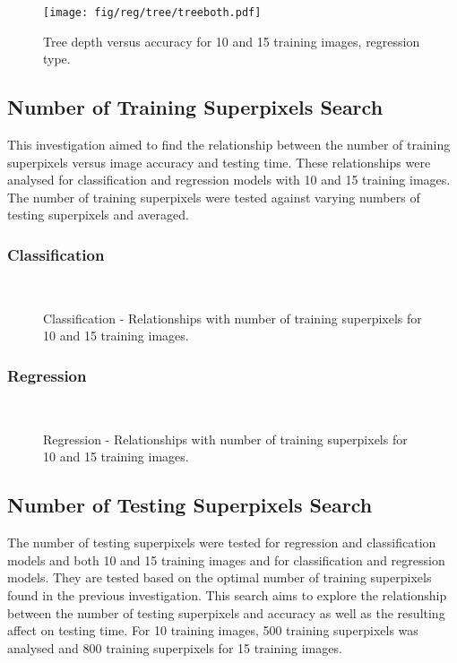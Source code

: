 \begin{figure}[H]
\centering
\texttt{[image: fig/reg/tree/treeboth.pdf]}
\caption{Tree depth versus accuracy for 10 and 15 training images, regression type.}
\label{reg:tree}
\end{figure}

\subsection{Number of Training Superpixels Search}
\label{res:trainpix}
This investigation aimed to find the relationship between the number of training superpixels versus image accuracy and testing time. These relationships were analysed for classification and regression models with 10 and 15 training images. The number of training superpixels were tested against varying numbers of testing superpixels and averaged. 

\subsubsection{Classification}
\begin{figure}[H]
    \centering
    \\
    \caption{Classification - Relationships with number of training superpixels for 10 and 15 training images.}%
    \label{class:trainpix}
\end{figure}

\subsubsection{Regression}
\begin{figure}[H]
    \centering
    \\
    \caption{Regression - Relationships with number of training superpixels for 10 and 15 training images.}%
    \label{reg:trainpix}
\end{figure}


\subsection{Number of Testing Superpixels Search}
The number of testing superpixels were tested for regression and classification models and both 10 and 15 training images and for classification and regression models. They are tested based on the optimal number of training superpixels found in the previous investigation. This search aims to explore the relationship between the number of testing superpixels and accuracy as well as the resulting affect on testing time. For 10 training images, 500 training superpixels was analysed and 800 training superpixels for 15 training images.

